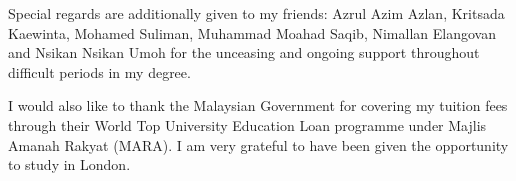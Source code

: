 \noindent Special regards are additionally given to my friends: Azrul Azim Azlan, Kritsada Kaewinta, Mohamed Suliman, Muhammad Moahad Saqib, Nimallan Elangovan and Nsikan Nsikan Umoh for the unceasing and ongoing support throughout difficult periods in my degree.

\noindent I would also like to thank the Malaysian Government for covering my tuition fees through their World Top University Education Loan programme under Majlis Amanah Rakyat (MARA). I am very grateful to have been given the opportunity to study in London.

%
